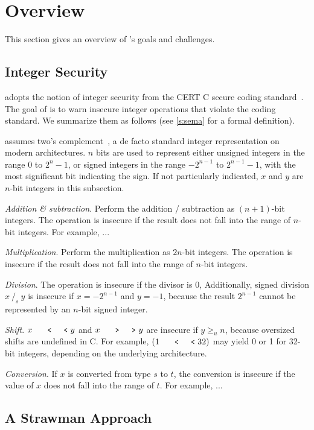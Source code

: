\section{Overview}
\label{s:oview}

This section gives an overview of \sys's goals and challenges.

\subsection{Integer Security}

\sys adopts the notion of integer security from the CERT C secure
coding standard~\cite[Ch.~5]{seacord:secure-c}.  The goal of \sys
is to warn insecure integer operations that violate the coding standard.
We summarize them as follows (see \autoref{s:sema} for a formal
definition).

\sys assumes two's complement~\cite[Ch.~4.2.1]{intel:vol1}, a de
facto standard integer representation on modern architectures.
$n$ bits are used to represent either unsigned integers in the range
$0$ to $2^n-1$, or signed integers in the range $-2^{n-1}$ to
$2^{n-1}-1$, with the most significant bit indicating the sign.  If
not particularly indicated, $x$ and $y$ are $n$-bit integers in
this subsection.

\noindent
{\it Addition \& subtraction}.
Perform the addition / subtraction as $(n+1)$-bit integers.
The operation is insecure if the result does not fall into the range of
$n$-bit integers.  For example, ...

\noindent
{\it Multiplication}.
Perform the multiplication as $2n$-bit integers.
The operation is insecure if the result does not fall
into the range of $n$-bit integers.

\noindent
{\it Division}.
The operation is insecure if the divisor is 0, Additionally, signed
division $x\ /_s\ y$ is insecure if $x = -2^{n-1}$ and $y = -1$,
because the result $2^{n-1}$ cannot be represented by an $n$-bit
signed integer.

\noindent
{\it Shift}. $x \shl y$ and $x \shr y$ are insecure if $y \geq_u n$,
because oversized shifts are undefined in C.  For example, $(1 \shl
32)$ may yield 0 or 1 for 32-bit integers, depending on the underlying
architecture.

\noindent
{\it Conversion}.
If $x$ is converted from type $s$ to $t$, the conversion is insecure
if the value of $x$ does not fall into the range of $t$.  For example,
...

\subsection{A Strawman Approach}

